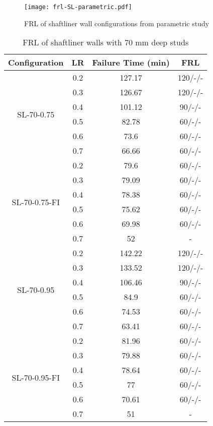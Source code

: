 \begin{figure}[!htbp]
	\centering
	\texttt{[image: frl-SL-parametric.pdf]}
	\caption{FRL of shaftliner wall configurations from parametric study}
	\label{fig:frl-SL-parametric}
\end{figure}
\begin{table}[!htbp]
	\centering
	\caption{FRL of shaftliner walls with 70 mm deep studs}
	  \begin{tabular}{cccc}
	  \toprule
	  Configuration & LR    & Failure Time (min) & FRL \\
	  \midrule
	  \multirow{6}[2]{*}{SL-70-0.75} & 0.2   & 127.17 & 120/-/- \\
			& 0.3   & 126.67 & 120/-/- \\
			& 0.4   & 101.12 & 90/-/- \\
			& 0.5   & 82.78 & 60/-/- \\
			& 0.6   & 73.6  & 60/-/- \\
			& 0.7   & 66.66 & 60/-/- \\
	  \midrule
	  \multirow{6}[2]{*}{SL-70-0.75-FI} & 0.2   & 79.6  & 60/-/- \\
			& 0.3   & 79.09 & 60/-/- \\
			& 0.4   & 78.38 & 60/-/- \\
			& 0.5   & 75.62 & 60/-/- \\
			& 0.6   & 69.98 & 60/-/- \\
			& 0.7   & 52    & - \\
	  \midrule
	  \multirow{6}[2]{*}{SL-70-0.95} & 0.2   & 142.22 & 120/-/- \\
			& 0.3   & 133.52 & 120/-/- \\
			& 0.4   & 106.46 & 90/-/- \\
			& 0.5   & 84.9  & 60/-/- \\
			& 0.6   & 74.53 & 60/-/- \\
			& 0.7   & 63.41 & 60/-/- \\
	  \midrule
	  \multirow{6}[2]{*}{SL-70-0.95-FI} & 0.2   & 81.96 & 60/-/- \\
			& 0.3   & 79.88 & 60/-/- \\
			& 0.4   & 78.64 & 60/-/- \\
			& 0.5   & 77    & 60/-/- \\
			& 0.6   & 70.61 & 60/-/- \\
			& 0.7   & 51    & - \\
	  \bottomrule
	  \end{tabular}%
	\label{tab:frl-parametric-sl-70}%
  \end{table}%

